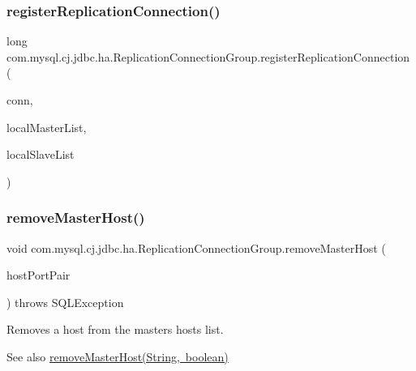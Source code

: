 \subsubsection{\texorpdfstring{register\+Replication\+Connection()}{registerReplicationConnection()}}
{\footnotesize\ttfamily long com.\+mysql.\+cj.\+jdbc.\+ha.\+Replication\+Connection\+Group.\+register\+Replication\+Connection (\begin{DoxyParamCaption}\item[{\mbox{\hyperlink{interfacecom_1_1mysql_1_1cj_1_1jdbc_1_1ha_1_1_replication_connection}{Replication\+Connection}}}]{conn,  }\item[{List$<$ String $>$}]{local\+Master\+List,  }\item[{List$<$ String $>$}]{local\+Slave\+List }\end{DoxyParamCaption})}

\mbox{\label{classcom_1_1mysql_1_1cj_1_1jdbc_1_1ha_1_1_replication_connection_group_a89849560352e7621bd8133af1af0dd3e}} 
\subsubsection{\texorpdfstring{remove\+Master\+Host()}{removeMasterHost()}\hspace{0.1cm}{\footnotesize\ttfamily [1/2]}}
{\footnotesize\ttfamily void com.\+mysql.\+cj.\+jdbc.\+ha.\+Replication\+Connection\+Group.\+remove\+Master\+Host (\begin{DoxyParamCaption}\item[{String}]{host\+Port\+Pair }\end{DoxyParamCaption}) throws S\+Q\+L\+Exception}

Removes a host from the masters hosts list.

\begin{DoxySeeAlso}{See also}
\mbox{\hyperlink{classcom_1_1mysql_1_1cj_1_1jdbc_1_1ha_1_1_replication_connection_group_a63d001e066840fdb7b35f01464baedb0}{remove\+Master\+Host(\+String, boolean)}} 
\end{DoxySeeAlso}
\mbox{\label{classcom_1_1mysql_1_1cj_1_1jdbc_1_1ha_1_1_replication_connection_group_a63d001e066840fdb7b35f01464baedb0}} 
